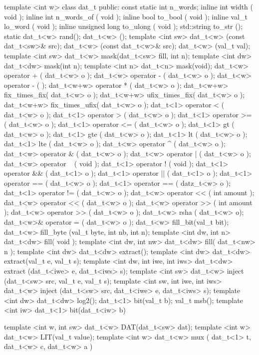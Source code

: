 \documentclass[10pt,twocolumn]{article}
\begin{document}
\begin{cpp}
template <int w>
class dat_t {
 public:
  const static int n_words;
  inline int width ( void );
  inline int n_words_of ( void );
  inline bool to_bool ( void );
  inline val_t lo_word ( void );
  inline unsigned long to_ulong ( void );
  std::string to_str ();
  static dat_t<w> rand();
  dat_t<w> ();
template <int sw> 
  dat_t<w> (const dat_t<sw>& src);
  dat_t<w> (const dat_t<w>& src);
  dat_t<w> (val_t val);
template <int sw> 
  dat_t<w> mask(dat_t<sw> fill, int n);
template <int dw> 
  dat_t<dw> mask(int n);
template <int n> 
  dat_t<n> mask(void);
  dat_t<w> operator + ( dat_t<w> o );
  dat_t<w> operator - ( dat_t<w> o );
  dat_t<w> operator - ( );
  dat_t<w+w> operator * ( dat_t<w> o );
  dat_t<w+w> fix_times_fix( dat_t<w> o );
  dat_t<w+w> ufix_times_fix( dat_t<w> o );
  dat_t<w+w> fix_times_ufix( dat_t<w> o );
  dat_t<1> operator < ( dat_t<w> o );
  dat_t<1> operator > ( dat_t<w> o );
  dat_t<1> operator >= ( dat_t<w> o );
  dat_t<1> operator <= ( dat_t<w> o );
  dat_t<1> gt ( dat_t<w> o );
  dat_t<1> gte ( dat_t<w> o );
  dat_t<1> lt ( dat_t<w> o );
  dat_t<1> lte ( dat_t<w> o );
  dat_t<w> operator ^ ( dat_t<w> o );
  dat_t<w> operator & ( dat_t<w> o );
  dat_t<w> operator | ( dat_t<w> o );
  dat_t<w> operator ~ ( void );
  dat_t<1> operator ! ( void );
  dat_t<1> operator && ( dat_t<1> o );
  dat_t<1> operator || ( dat_t<1> o );
  dat_t<1> operator == ( dat_t<w> o );
  dat_t<1> operator == ( datz_t<w> o );
  dat_t<1> operator != ( dat_t<w> o );
  dat_t<w> operator << ( int amount );
  dat_t<w> operator << ( dat_t<w> o );
  dat_t<w> operator >> ( int amount );
  dat_t<w> operator >> ( dat_t<w> o );
  dat_t<w> rsha ( dat_t<w> o);
  dat_t<w>& operator = ( dat_t<w> o );
  dat_t<w> fill_bit(val_t bit);
  dat_t<w> fill_byte
    (val_t byte, int nb, int n);
template <int dw, int n> 
  dat_t<dw> fill( void );
template <int dw, int nw> 
  dat_t<dw> fill( dat_t<nw> n );
template <int dw> 
  dat_t<dw> extract();
template <int dw> 
  dat_t<dw> extract(val_t e, val_t s);
template <int dw, int iwe, int iws> 
  dat_t<dw> extract
    (dat_t<iwe> e, dat_t<iws> s);
template <int sw> 
  dat_t<w> inject
    (dat_t<sw> src, val_t e, val_t s);
template <int sw, int iwe, int iws> 
  dat_t<w> inject
    (dat_t<sw> src, 
     dat_t<iwe> e, dat_t<iws> s);
template <int dw> 
  dat_t<dw> log2();
  dat_t<1> bit(val_t b);
  val_t msb();
template <int iw>
  dat_t<1> bit(dat_t<iw> b)
}
\end{cpp}

\begin{cpp}
template <int w, int sw> 
  dat_t<w> DAT(dat_t<sw> dat);
template <int w> 
  dat_t<w> LIT(val_t value);
template <int w> dat_t<w> 
  mux ( dat_t<1> t, dat_t<w> c, dat_t<w> a )
\end{cpp}
\end{document}
